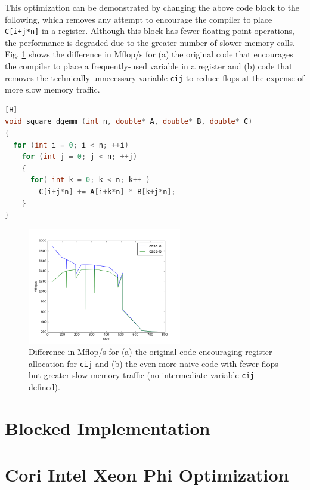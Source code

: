 \documentclass[10pt]{article}
\begin{document}
This optimization can be demonstrated by changing the above code block to the following, which removes any attempt to encourage the compiler to place {\tt C[i+j*n]} in a register. Although this block has fewer floating point operations, the performance is degraded due to the greater number of slower memory calls. Fig. \ref{fig:1} shows the difference in Mflop/s for (a) the original code that encourages the compiler to place a frequently-used variable in a register and (b) code that removes the technically unnecessary variable {\tt cij} to reduce flops at the expense of more slow memory traffic.

\begin{lstlisting}[language=C][H]
void square_dgemm (int n, double* A, double* B, double* C)
{
  for (int i = 0; i < n; ++i)
    for (int j = 0; j < n; ++j)
    {
      for( int k = 0; k < n; k++ )
        C[i+j*n] += A[i+k*n] * B[k+j*n];
    }
}
\end{lstlisting}

\begin{figure}[H]
\centering
\includegraphics[width=0.6\textwidth]{fig1.png}
\caption{Difference in Mflop/s for (a) the original code encouraging register-allocation for {\tt cij} and (b) the even-more naive code with fewer flops but greater slow memory traffic (no intermediate variable {\tt cij} defined).}
\label{fig:1}
\end{figure}

\section{Blocked Implementation}

\section{Cori Intel Xeon Phi Optimization}
\end{document}
